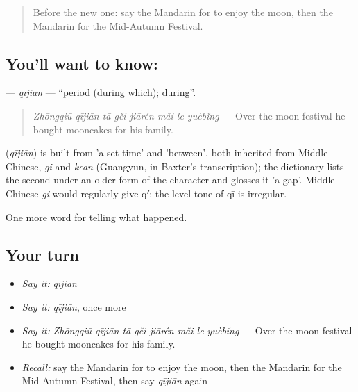 \label{lesson:ZH-C342-qijian}



\begin{quote}
Before the new one: say the Mandarin for to enjoy the moon, then the Mandarin for the Mid-Autumn Festival.
\end{quote}

\subsection*{You'll want to know: }
\textbf{} — \emph{qījiān} — \textquotedblleft{}period (during which); during\textquotedblright{}.

\begin{quote}
\textbf{} \emph{Zhōngqiū qījiān tā gěi jiārén mǎi le yuèbǐng} — Over the moon festival he bought mooncakes for his family.
\end{quote}

\begin{cousinweb}
\textbf{} (\emph{qījiān}) is built from  'a set time' and  'between', both inherited from Middle Chinese, \emph{gi} and \emph{kean} (Guangyun, in Baxter's transcription); the dictionary lists the second under an older form of the character and glosses it 'a gap'. Middle Chinese \emph{gi} would regularly give qí; the level tone of qī is irregular.
\end{cousinweb}

\begin{grammarlens}[title={What you've built}]
One more word for telling what happened.
\end{grammarlens}

\subsection*{Your turn}
\begin{itemize}
\raggedright
  \item \emph{Say it:} \emph{qījiān}
  \item \emph{Say it:} \emph{qījiān}, once more
  \item \emph{Say it:} \emph{Zhōngqiū qījiān tā gěi jiārén mǎi le yuèbǐng} — Over the moon festival he bought mooncakes for his family.
  \item \emph{Recall:} say the Mandarin for to enjoy the moon, then the Mandarin for the Mid-Autumn Festival, then say \emph{qījiān} again
\end{itemize}

